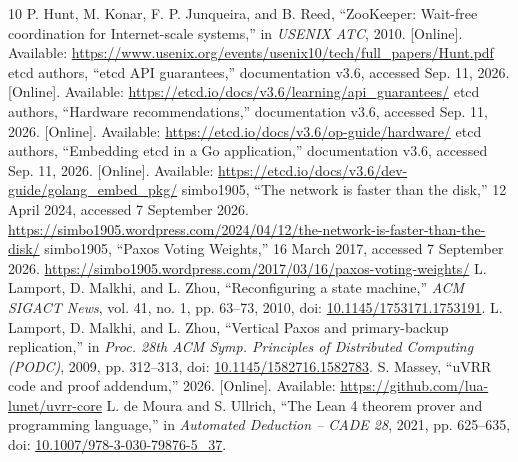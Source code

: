\documentclass[10pt,journal,letterpaper]{IEEEtran}
\begin{document}
\begin{thebibliography}{10}
 P. Hunt, M. Konar, F. P. Junqueira, and B. Reed, ``ZooKeeper: Wait-free coordination for Internet-scale systems,'' in \emph{USENIX ATC}, 2010. [Online]. Available: \url{https://www.usenix.org/events/usenix10/tech/full_papers/Hunt.pdf}
 etcd authors, ``etcd API guarantees,'' documentation v3.6, accessed Sep. 11, 2026. [Online]. Available: \url{https://etcd.io/docs/v3.6/learning/api_guarantees/}
 etcd authors, ``Hardware recommendations,'' documentation v3.6, accessed Sep. 11, 2026. [Online]. Available: \url{https://etcd.io/docs/v3.6/op-guide/hardware/}
 etcd authors, ``Embedding etcd in a Go application,'' documentation v3.6, accessed Sep. 11, 2026. [Online]. Available: \url{https://etcd.io/docs/v3.6/dev-guide/golang_embed_pkg/}
 simbo1905, ``The network is faster than the disk,'' 12 April
2024, accessed 7 September 2026.
\url{https://simbo1905.wordpress.com/2024/04/12/the-network-is-faster-than-the-disk/}
 simbo1905, ``Paxos Voting Weights,'' 16 March 2017,
accessed 7 September 2026.
\url{https://simbo1905.wordpress.com/2017/03/16/paxos-voting-weights/}
 L. Lamport, D. Malkhi, and L. Zhou, ``Reconfiguring a state machine,'' \emph{ACM SIGACT News}, vol. 41, no. 1, pp. 63--73, 2010, doi: \href{https://doi.org/10.1145/1753171.1753191}{10.1145/1753171.1753191}.
 L. Lamport, D. Malkhi, and L. Zhou, ``Vertical Paxos and primary-backup replication,'' in \emph{Proc. 28th ACM Symp. Principles of Distributed Computing (PODC)}, 2009, pp. 312--313, doi: \href{https://doi.org/10.1145/1582716.1582783}{10.1145/1582716.1582783}.
 S. Massey, ``uVRR code and proof addendum,'' 2026. [Online]. Available: \url{https://github.com/lua-lunet/uvrr-core}
 L. de Moura and S. Ullrich, ``The Lean 4 theorem prover and programming language,'' in \emph{Automated Deduction -- CADE 28}, 2021, pp. 625--635, doi: \href{https://doi.org/10.1007/978-3-030-79876-5_37}{10.1007/978-3-030-79876-5\_37}.
\end{thebibliography}
\end{document}
